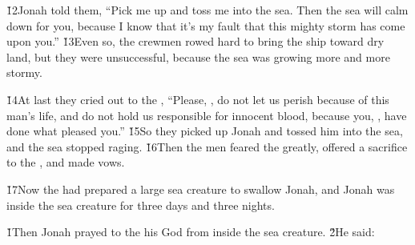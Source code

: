 \v{12}Jonah told them, ``Pick me up and toss me into the sea. Then the sea will calm down for you, because I know that it's my fault that this mighty storm has come upon you.'' \v{13}Even so, the crewmen rowed hard to bring the ship toward dry land, but they were unsuccessful, because the sea was growing more and more stormy.

\v{14}At last they cried out to the , ``Please, , do not let us perish because of this man's life, and do not hold us responsible for innocent blood, because you, , have done what pleased you.'' \v{15}So they picked up Jonah and tossed him into the sea, and the sea stopped raging. \v{16}Then the men feared the  greatly, offered a sacrifice to the , and made vows.

\v{17}Now the  had prepared a large sea creature to swallow Jonah, and Jonah was inside the sea creature for three days and three nights.

\v{1}Then Jonah prayed to the  his God from inside the sea creature. \v{2}He said:

